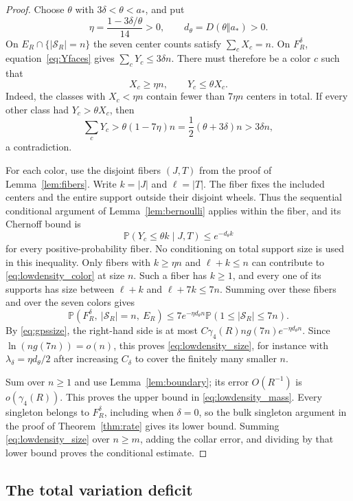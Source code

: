 \documentclass[11pt]{amsart}
\theoremstyle{remark}
\newcommand{\Prob}{\mathbb P}
\newcommand{\cS}{\mathcal S}
\newcommand{\astar}{a_*}
\begin{document}
\begin{proof}
Choose $\theta$ with $3\delta<\theta<\astar$, and put
\[
 \eta=\frac{1-3\delta/\theta}{14}>0,\qquad
 d_\theta=D(\theta\Vert\astar)>0.
\]
On $E_R\cap\{|\cS_R|=n\}$ the seven center counts satisfy $\sum_cX_c=n$. On $F_R^\delta$, equation~\eqref{eq:Yfaces} gives $\sum_cY_c\le3\delta n$. There must therefore be a color $c$ such that
\begin{equation}\label{eq:lowdensity_color}
 X_c\ge\eta n,\qquad Y_c\le\theta X_c.
\end{equation}
Indeed, the classes with $X_c<\eta n$ contain fewer than $7\eta n$ centers in total. If every other class had $Y_c>\theta X_c$, then
\[
 \sum_cY_c>\theta(1-7\eta)n=\frac12(\theta+3\delta)n>3\delta n,
\]
a contradiction.

For each color, use the disjoint fibers $(J,T)$ from the proof of Lemma~\ref{lem:fibers}. Write $k=|J|$ and $\ell=|T|$. The fiber fixes the included centers and the entire support outside their disjoint wheels. Thus the sequential conditional argument of Lemma~\ref{lem:bernoulli} applies within the fiber, and its Chernoff bound is
\[
 \Prob(Y_c\le\theta k\mid J,T)\le e^{-d_\theta k}
\]
for every positive-probability fiber. No conditioning on total support size is used in this inequality. Only fibers with $k\ge\eta n$ and $\ell+k\le n$ can contribute to \eqref{eq:lowdensity_color} at size $n$. Such a fiber has $k\ge1$, and every one of its supports has size between $\ell+k$ and $\ell+7k\le7n$. Summing over these fibers and over the seven colors gives
\[
 \Prob(F_R^\delta,\ |\cS_R|=n,\ E_R)
 \le7e^{-\eta d_\theta n}\Prob(1\le|\cS_R|\le7n).
\]
By \eqref{eq:gpssize}, the right-hand side is at most $C\gamma_4(R)ng(7n)e^{-\eta d_\theta n}$. Since $\ln(ng(7n))=o(n)$, this proves \eqref{eq:lowdensity_size}, for instance with $\lambda_\delta=\eta d_\theta/2$ after increasing $C_\delta$ to cover the finitely many smaller $n$.

Sum over $n\ge1$ and use Lemma~\ref{lem:boundary}; its error $O(R^{-1})$ is $o(\gamma_4(R))$. This proves the upper bound in \eqref{eq:lowdensity_mass}. Every singleton belongs to $F_R^\delta$, including when $\delta=0$, so the bulk singleton argument in the proof of Theorem~\ref{thm:rate} gives its lower bound. Summing \eqref{eq:lowdensity_size} over $n\ge m$, adding the collar error, and dividing by that lower bound proves the conditional estimate.
\end{proof}

\subsection{The total variation deficit}\label{sec:TV}
\end{document}
